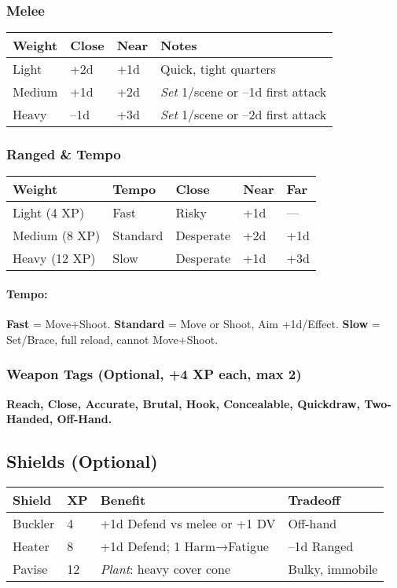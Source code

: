 \subsubsection*{Melee}
\begin{tabular}{llll}
\toprule
\textbf{Weight} & \textbf{Close} & \textbf{Near} & \textbf{Notes} \\
\midrule
Light & +2d & +1d & Quick, tight quarters \\
Medium & +1d & +2d & \emph{Set} 1/scene or –1d first attack \\
Heavy & –1d & +3d & \emph{Set} 1/scene or –2d first attack \\
\bottomrule
\end{tabular}

\subsubsection*{Ranged \& Tempo}
\begin{tabular}{lllll}
\toprule
\textbf{Weight} & \textbf{Tempo} & \textbf{Close} & \textbf{Near} & \textbf{Far} \\
\midrule
Light (4 XP) & Fast & Risky & +1d & — \\
Medium (8 XP) & Standard & Desperate & +2d & +1d \\
Heavy (12 XP) & Slow & Desperate & +1d & +3d \\
\bottomrule
\end{tabular}

\paragraph{Tempo:} \textbf{Fast} = Move+Shoot. \textbf{Standard} = Move or Shoot, Aim +1d/Effect. \textbf{Slow} = Set/Brace, full reload, cannot Move+Shoot.

\subsubsection{Weapon Tags (Optional, +4 XP each, max 2)}
\textbf{Reach, Close, Accurate, Brutal, Hook, Concealable, Quickdraw, Two-Handed, Off-Hand.}

\subsection{Shields (Optional)}
\begin{tabular}{llll}
\toprule
\textbf{Shield} & \textbf{XP} & \textbf{Benefit} & \textbf{Tradeoff} \\
\midrule
Buckler & 4 & +1d Defend vs melee or +1 DV & Off-hand \\
Heater  & 8 & +1d Defend; 1 Harm→Fatigue & –1d Ranged \\
Pavise  & 12 & \emph{Plant}: heavy cover cone & Bulky, immobile \\
\bottomrule
\end{tabular}

